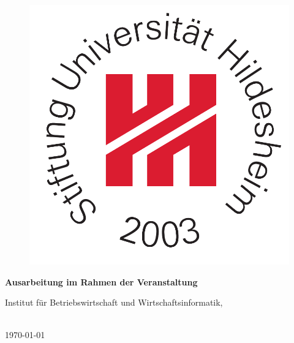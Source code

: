 \begin{titlepage}
\begin{figure}
\begin{minipage}{0.25\textwidth}
\begin{flushright}
            \includegraphics[scale=0.25]{St_Uni-Logo-9-2003-eps-converted-to.pdf}
        \end{flushright}
    \end{minipage}
    \vspace{4cm}
\end{figure}
\begin{center}

    \Huge{\textbf{\titel}}

    \Huge{\textbf{\untertitel}}
    \vspace{2cm}
\end{center}
\begin{center}
    \vspace*{0cm}
    \textbf{Ausarbeitung im Rahmen der Veranstaltung \veranstaltung}
    \vspace{1cm}
\end{center}
\begin{center}
    Institut für Betriebswirtschaft und Wirtschaftsinformatik,

    \arbeitsgruppe
\end{center}
\begin{center}
    \vspace{5cm}
    \autor\\


    \today
\end{center}
\end{titlepage}
\newpage


